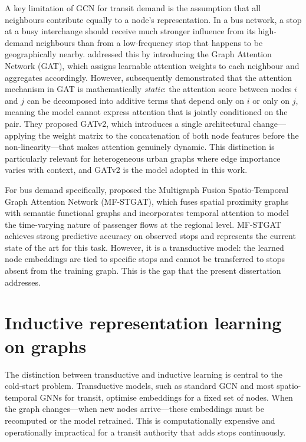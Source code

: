 \documentclass[12pt,a4paper]{report}
\begin{document}
A key limitation of GCN for transit demand is the assumption that all
neighbours contribute equally to a node's representation. In a bus network,
a stop at a busy interchange should receive much stronger influence from its
high-demand neighbours than from a low-frequency stop that happens to be
geographically nearby. \citet{velickovic2018graph} addressed this by
introducing the Graph Attention Network (GAT), which assigns learnable
attention weights to each neighbour and aggregates accordingly. However,
\citet{brody2022how} subsequently demonstrated that the attention mechanism
in GAT is mathematically \emph{static}: the attention score between nodes $i$
and $j$ can be decomposed into additive terms that depend only on $i$ or
only on $j$, meaning the model cannot express attention that is jointly
conditioned on the pair. They proposed GATv2, which introduces a single
architectural change---applying the weight matrix to the concatenation of
both node features before the non-linearity---that makes attention genuinely
dynamic. This distinction is particularly relevant for heterogeneous urban
graphs where edge importance varies with context, and GATv2 is the model
adopted in this work.

For bus demand specifically, \citet{zheng2025mfstgat} proposed the
Multigraph Fusion Spatio-Temporal Graph Attention Network (MF-STGAT), which
fuses spatial proximity graphs with semantic functional graphs and incorporates
temporal attention to model the time-varying nature of passenger flows at
the regional level. MF-STGAT achieves strong predictive accuracy on observed
stops and represents the current state of the art for this task. However, it
is a transductive model: the learned node embeddings are tied to specific
stops and cannot be transferred to stops absent from the training graph.
This is the gap that the present dissertation addresses.

\section{Inductive representation learning on graphs}
The distinction between transductive and inductive learning is central to
the cold-start problem. Transductive models, such as standard GCN and most
spatio-temporal GNNs for transit, optimise embeddings for a fixed set of
nodes. When the graph changes---when new nodes arrive---these embeddings must
be recomputed or the model retrained. This is computationally expensive and
operationally impractical for a transit authority that adds stops continuously.
\end{document}
